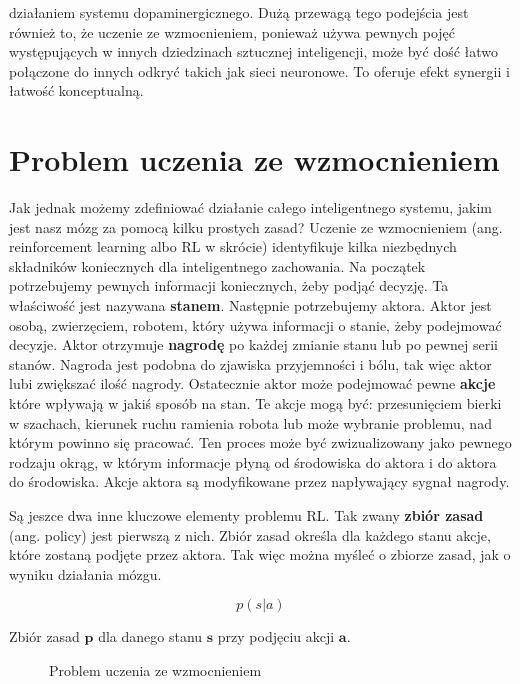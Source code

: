 działaniem systemu dopaminergicznego. Dużą przewagą tego podejścia jest również to, że uczenie ze wzmocnieniem, ponieważ używa pewnych pojęć występujących w innych dziedzinach sztucznej inteligencji, może być dość łatwo połączone do innych odkryć takich jak sieci neuronowe. To oferuje efekt synergii i łatwość konceptualną.

\section{Problem uczenia ze wzmocnieniem}

Jak jednak możemy zdefiniować działanie całego inteligentnego systemu, jakim jest nasz mózg za pomocą kilku prostych zasad? Uczenie ze wzmocnieniem (ang. reinforcement learning albo RL w skrócie) identyfikuje kilka niezbędnych składników koniecznych dla inteligentnego zachowania. Na początek potrzebujemy pewnych informacji koniecznych, żeby podjąć decyzję. Ta właściwość jest nazywana \textbf{stanem}. Następnie potrzebujemy aktora. Aktor jest osobą, zwierzęciem, robotem, który używa informacji o stanie, żeby podejmować decyzje. Aktor otrzymuje \textbf{nagrodę} po każdej zmianie stanu lub po pewnej serii stanów. Nagroda jest podobna do zjawiska przyjemności i bólu, tak więc aktor lubi zwiększać ilość nagrody. Ostatecznie aktor może podejmować pewne \textbf{akcje} które wpływają w jakiś sposób na stan. Te akcje mogą być: przesunięciem bierki w szachach, kierunek ruchu ramienia robota lub może wybranie problemu, nad którym powinno się pracować. Ten proces może być zwizualizowany jako pewnego rodzaju okrąg, w którym informacje płyną od środowiska do aktora i do aktora do środowiska. Akcje aktora są modyfikowane przez napływający sygnał nagrody.\newline

\noindent Są jeszce dwa inne kluczowe elementy problemu RL. Tak zwany \textbf{zbiór zasad} (ang. policy) jest pierwszą z nich. Zbiór zasad określa dla każdego stanu akcje, które zostaną podjęte przez aktora. Tak więc można myśleć o zbiorze zasad, jak o wyniku działania mózgu.

\begin{equation}
p(s|a)
\end{equation}

\noindent Zbiór zasad $\boldsymbol{p}$ dla danego stanu $\boldsymbol{s}$ przy podjęciu akcji $\boldsymbol{a}$.\newline

\clearpage
\begin{figure}[H]
\centering

\caption{Problem uczenia ze wzmocnieniem}
\end{figure}
\clearpage

